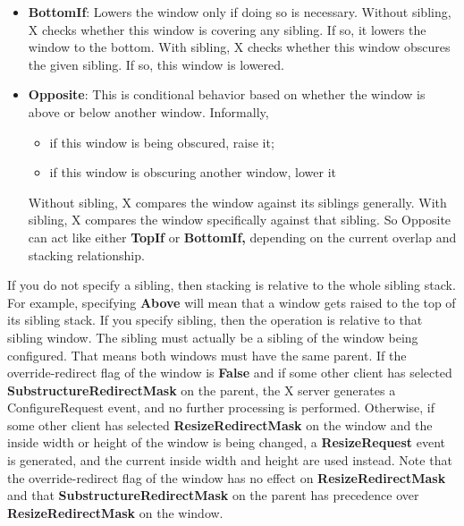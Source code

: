 \documentclass{report}
\begin{document}
\begin{itemize}
\begin{itemize}
                    \bigbreak \noindent 
                    With sibling, X checks the relationship between this window and that sibling. If the sibling obscures this window, then this window is raised.
                \item \textbf{BottomIf}: Lowers the window only if doing so is necessary.
                    \bigbreak \noindent 
                    Without sibling, X checks whether this window is covering any sibling. If so, it lowers the window to the bottom.
                    \bigbreak \noindent 
                    With sibling, X checks whether this window obscures the given sibling. If so, this window is lowered.
                \item \textbf{Opposite}: This is conditional behavior based on whether the window is above or below another window.
                    \bigbreak \noindent 
                    Informally,
                    \begin{itemize}
                        \item if this window is being obscured, raise it;
                        \item if this window is obscuring another window, lower it
                    \end{itemize}
                    Without sibling, X compares the window against its siblings generally.
                    \bigbreak \noindent 
                    With sibling, X compares the window specifically against that sibling.
                    \bigbreak \noindent 
                    So Opposite can act like either \textbf{TopIf} or \textbf{BottomIf,} depending on the current overlap and stacking relationship.
            \end{itemize}
            If you do not specify a sibling, then stacking is relative to the whole sibling stack. For example, specifying \textbf{Above} will mean that a window gets raised to the top of its sibling stack.
            \bigbreak \noindent 
            If you specify sibling, then the operation is relative to that sibling window.
            \bigbreak \noindent 
            The sibling must actually be a sibling of the window being configured. That means both windows must have the same parent.
            \bigbreak \noindent 
            If the override-redirect flag of the window is \textbf{False} and if some other client has selected \textbf{SubstructureRedirectMask} on the parent, the X server generates a ConfigureRequest event, and no further processing is performed. Otherwise, if some other client has selected \textbf{ResizeRedirectMask} on the window and the inside width or height of the window is being changed, a \textbf{ResizeRequest} event is generated, and the current inside width and height are used instead. Note that the override-redirect flag of the window has no effect on \textbf{ResizeRedirectMask} and that \textbf{SubstructureRedirectMask} on the parent has precedence over \textbf{ResizeRedirectMask} on the window.

\end{itemize}
\end{document}
